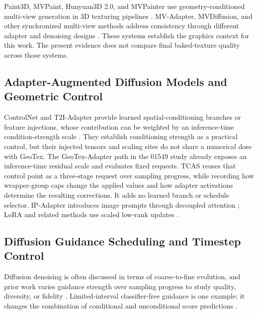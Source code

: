 \documentclass[times,twocolumn,final]{elsarticle}
\begin{document}
Paint3D, MVPaint, Hunyuan3D 2.0, and MVPainter use geometry-conditioned multi-view generation in 3D texturing pipelines \cite{zeng2024paint3d,cheng2024mvpaint,lai2025hunyuan3d,shao2025mvpainter}. MV-Adapter, MVDiffusion, and other synchronized multi-view methods address consistency through different adapter and denoising designs \cite{huang2024mvadapter,tang2023mvdiffusion,liu2024synchronized,xu2026wondertex}. These systems establish the graphics context for this work. The present evidence does not compare final baked-texture quality across those systems.

\subsection{Adapter-Augmented Diffusion Models and Geometric Control}
\label{subsec:adapter}

ControlNet and T2I-Adapter provide learned spatial-conditioning branches or feature injections, whose contribution can be weighted by an inference-time condition-strength scale \cite{mou2023t2iadapter,zhang2023controlnet}. They establish conditioning strength as a practical control, but their injected tensors and scaling sites do not share a numerical dose with GeoTex. The GeoTex-Adapter path in the 01549 study already exposes an inference-time residual scale and evaluates fixed requests. TCAS reuses that control point as a three-stage request over sampling progress, while recording how wrapper-group caps change the applied values and how adapter activations determine the resulting corrections. It adds no learned branch or schedule selector. IP-Adapter introduces image prompts through decoupled attention \cite{ye2023ipadapter}; LoRA and related methods use scaled low-rank updates \cite{hu2022lora,liu2024dora,zhang2023adalora}.

\subsection{Diffusion Guidance Scheduling and Timestep Control}
\label{subsec:guidance}

Diffusion denoising is often discussed in terms of coarse-to-fine evolution, and prior work varies guidance strength over sampling progress to study quality, diversity, or fidelity \cite{ho2020ddpm,song2021ddim,ho2022cfg,castillo2023adaptive}. Limited-interval classifier-free guidance is one example; it changes the combination of conditional and unconditional score predictions \cite{kynkanniemi2024limited}.
\end{document}

